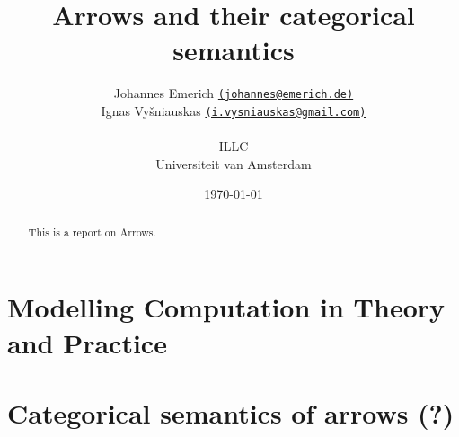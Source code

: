\documentclass[12pt,a4paper,titlepage]{scrreprt}
\title{Arrows and their categorical semantics}
\author{
    Johannes Emerich
        \href{mailto:Johannes@emerich.de}{
        \normalsize \texttt{(johannes@emerich.de)}}\\
    Ignas Vyšniauskas
        \href{mailto:i.vysniauskas@gmail.com}{
        \normalsize \texttt{(i.vysniauskas@gmail.com)}}\\
\\
  ILLC \\
  Universiteit van Amsterdam
}
\date{\today}
\theoremstyle{definition}
\theoremstyle{plain}
\begin{document}
\maketitle

\begin{abstract}
    This is a report on Arrows.
\end{abstract}


\chapter{Modelling Computation in Theory and Practice}
    
    
\chapter{Categorical semantics of arrows (?)}
    
    
    

\nocite{mustard}
\printbibliography
\end{document}
